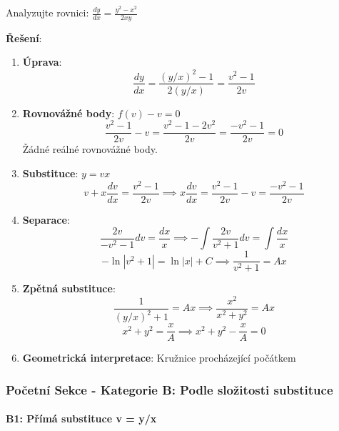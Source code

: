 \begin{example}
Analyzujte rovnici: $\frac{dy}{dx} = \frac{y^2 - x^2}{2xy}$
\vspace{0.3\baselineskip}

\textbf{Řešení}: 
\begin{enumerate}
\item \textbf{Úprava}:
\[
\frac{dy}{dx} = \frac{(y/x)^2 - 1}{2(y/x)} = \frac{v^2 - 1}{2v}
\]

\item \textbf{Rovnovážné body}: $f(v) - v = 0$
\[
\frac{v^2 - 1}{2v} - v = \frac{v^2 - 1 - 2v^2}{2v} = \frac{-v^2 - 1}{2v} = 0
\]
Žádné reálné rovnovážné body.

\item \textbf{Substituce}: $y = vx$
\[
v + x\frac{dv}{dx} = \frac{v^2 - 1}{2v} \implies x\frac{dv}{dx} = \frac{v^2 - 1}{2v} - v = \frac{-v^2 - 1}{2v}
\]

\item \textbf{Separace}:
\[
\frac{2v}{-v^2 - 1}dv = \frac{dx}{x} \implies -\int \frac{2v}{v^2 + 1}dv = \int \frac{dx}{x}
\]
\[
-\ln|v^2 + 1| = \ln|x| + C \implies \frac{1}{v^2 + 1} = Ax
\]

\item \textbf{Zpětná substituce}:
\[
\frac{1}{(y/x)^2 + 1} = Ax \implies \frac{x^2}{x^2 + y^2} = Ax
\]
\[
x^2 + y^2 = \frac{x}{A} \implies x^2 + y^2 - \frac{x}{A} = 0
\]

\item \textbf{Geometrická interpretace}: Kružnice procházející počátkem
\end{enumerate}
\end{example}

\vspace{0.8\baselineskip}

\subsubsection{Početní Sekce - Kategorie B: Podle složitosti substituce}
\label{subsubsec:pocetni-kategorie-b}

\paragraph*{B1: Přímá substituce v = y/x}

